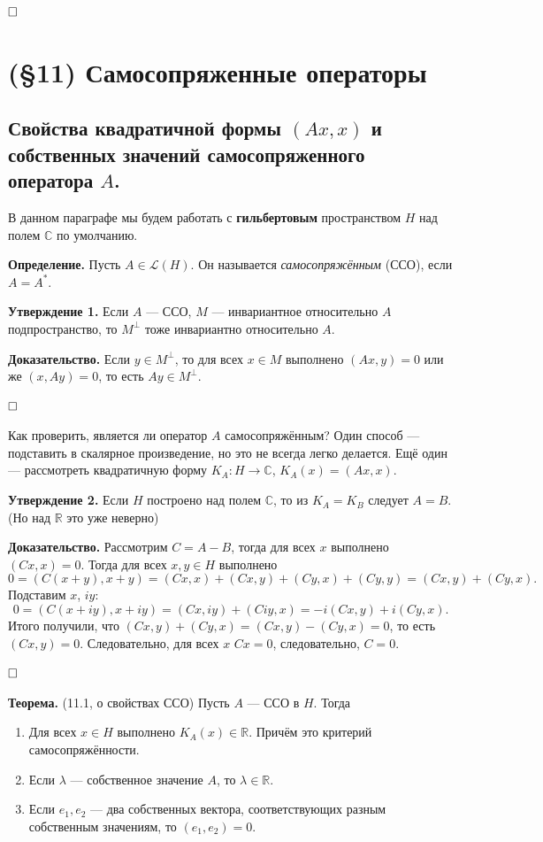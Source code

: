 \documentclass[12pt, a4paper]{article}
\newcommand{\QED}{$\hfill\square$}
\begin{document}
\QED



\section{(§11) Самосопряженные операторы}

\subsection{Свойства квадратичной формы \texorpdfstring{$(Ax, x)$}{(Ax, x)} и собственных значений самосопряженного оператора \texorpdfstring{$A$}{A}.}

В данном параграфе мы будем работать с \textbf{гильбертовым} пространством $H$ над полем $\mathbb C$ по умолчанию.

\textbf{Определение.} Пусть $A \in \mathcal L(H)$.
Он называется \textit{самосопряжённым} (ССО), если $A = A^*$.

\textbf{Утверждение 1.} Если $A$ --- ССО, $M$ --- инвариантное относительно $A$ подпространство, то $M^\bot$ тоже инвариантно относительно $A$.

\textbf{Доказательство.} Если $y \in M^\bot$, то для всех $x \in M$ выполнено $(Ax, y) = 0$ или же $(x, Ay) = 0$, то есть $Ay \in M^\bot$.

\QED

Как проверить, является ли оператор $A$ самосопряжённым?
Один способ --- подставить в скалярное произведение, но это не всегда легко делается.
Ещё один --- рассмотреть квадратичную форму $K_A: H \to \mathbb C$, $K_A(x) = (Ax, x)$.

\textbf{Утверждение 2.} Если $H$ построено над полем $\mathbb C$, то из $K_A = K_B$ следует $A = B$.
(Но над $\mathbb R$ это уже неверно)

\textbf{Доказательство.} Рассмотрим $C = A - B$, тогда для всех $x$ выполнено $(Cx, x) = 0$.
Тогда для всех $x, y \in H$ выполнено
\[
    0 = (C(x + y), x + y) = (Cx, x) + (Cx, y)+ (Cy, x) + (Cy, y) = (Cx, y)+ (Cy, x).
\]
Подставим $x$, $iy$:
\[
    0 = (C(x + iy), x + iy) = (Cx, iy) + (Ciy, x) = -i(Cx, y) + i(Cy, x).
\]
Итого получили, что $(Cx, y) + (Cy, x) = (Cx, y) - (Cy, x) = 0$, то есть $(Cx, y) = 0$. Следовательно, для всех $x$ $Cx = 0$, следовательно, $C = 0$.

\QED

 \label{th:11-1} \textbf{Теорема.} (11.1, о свойствах ССО) Пусть $A$ --- ССО в $H$.
Тогда
\begin{enumerate}
    \item Для всех $x \in H$ выполнено $K_A(x) \in \mathbb R$.
        Причём это критерий самосопряжённости.
    \item Если $\lambda$ --- собственное значение $A$, то $\lambda \in \mathbb R$.
    \item Если $e_1, e_2$ --- два собственных вектора, соответствующих разным собственным значениям, то $(e_1, e_2) = 0$.
\end{enumerate}
\end{document}
